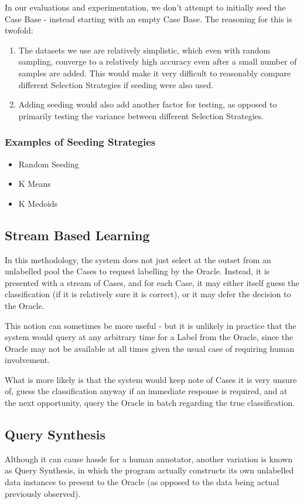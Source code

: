 \documentclass[a4paper,11pt]{report}
\begin{document}
In our evaluations and experimentation, we don't attempt to initially seed the Case Base - instead starting with an empty Case Base. The reasoning for this is twofold: 
\begin{enumerate}
	\item The datasets we use are relatively simplistic, which even with random sampling, converge to a relatively high accuracy even after a small number of samples are added. This would make it very difficult to reasonably compare different Selection Strategies if seeding were also used. 
	\item Adding seeding would also add another factor for testing, as opposed to primarily testing the variance between different Selection Strategies.
\end{enumerate}

\subsubsection{Examples of Seeding Strategies}
\begin{itemize}
	\item Random Seeding
	\item K Means
	\item K Medoids
\end{itemize}

\subsection{Stream Based Learning}
In this methodology, the system does not just select at the outset from an unlabelled pool the Cases to request labelling by the Oracle. Instead, it is presented with a stream of Cases, and for each Case, it may either itself guess the classification (if it is relatively sure it is correct), or it may defer the decision to the Oracle.

This notion can sometimes be more useful - but it is unlikely in practice that the system would query at any arbitrary time for a Label from the Oracle, since the Oracle may not be available at all times given the usual case of requiring human involvement.

What is more likely is that the system would keep note of Cases it is very unsure of, guess the classification anyway if an immediate response is required, and at the next opportunity, query the Oracle in batch regarding the true classification.

\subsection{Query Synthesis}
Although it can cause hassle for a human annotator, another variation is known as Query Synthesis, in which the program actually constructs its own unlabelled data instances to present to the Oracle (as opposed to the data being actual previously observed).
\end{document}
